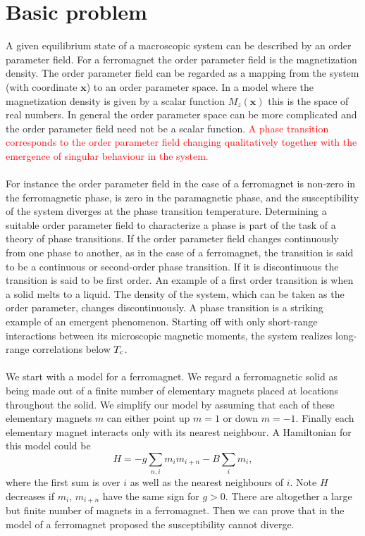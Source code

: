 \section{Basic problem}
A given equilibrium state of a macroscopic system can be described by an order parameter field. For a ferromagnet the order parameter field is the magnetization density. 
The order parameter field can be regarded as a mapping from the system (with coordinate $\bm{x}$) to an order parameter space. In a model where the magnetization density is given by a scalar function $M_z(\bm{x})$ this is the space of real numbers. In general the order parameter space can be more complicated and the order parameter field need not be a scalar function.
\textcolor{red}{ A phase transition corresponds to the order parameter field changing qualitatively together with the emergence of singular behaviour in the system.}
\\ \\
For instance the order parameter field in the case of a ferromagnet is non-zero in the ferromagnetic phase, is zero in the paramagnetic phase, and the susceptibility of the system diverges at the phase transition temperature. 
Determining a suitable order parameter field to characterize a phase is part of the task of a theory of phase transitions. If the order parameter field changes continuously from one phase to another, as in the case of a ferromagnet, the transition is said to be a continuous or second-order phase transition. If it is discontinuous the transition is said to be first order. 
An example of a first order transition is when a solid melts
to a liquid. The density of the system, which can be taken as the order parameter, changes discontinuously. A phase transition is a striking example of an emergent phenomenon. Starting off with only short-range interactions between its microscopic magnetic moments, the system realizes long-range correlations below $T_{\rm c}$.
\\ \\
We start with a model for a ferromagnet. We regard a ferromagnetic solid as being made out of a finite number of elementary magnets placed at locations throughout the solid.
We simplify our model by assuming that each of these elementary magnets $m$ can either point up $m = 1$ or down $m = -1$. Finally each elementary magnet interacts only with its nearest neighbour. A Hamiltonian for this model could be
\[H = -g\sum_{n,i}m_im_{i+n} - B\sum_i m_i,\]
where the first sum is over $i$ as well as the nearest neighbours of $i$. Note $H$ decreases if $m_i$, $m_{i+n}$ have the same sign for $g > 0$. There are altogether a large but finite number of magnets in a ferromagnet. Then we can prove that in the model of a ferromagnet proposed the susceptibility cannot diverge. 
